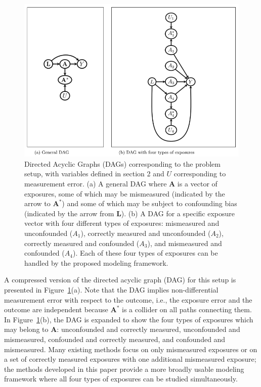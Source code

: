 \documentclass[useAMS,usenatbib,referee]{biom}
\begin{document}
\begin{figure}
\centering
\includegraphics[width=6in]{Paper1_Fig1.png}
\caption{Directed Acyclic Graphs (DAGs) corresponding to the problem setup, with variables defined in section 2 and $U$ corresponding to measurement error. (a) A general DAG where $\bm{A}$ is a vector of exposures, some of which may be mismeasured (indicated by the arrow to $\bm{A}^{*}$) and some of which may be subject to confounding bias (indicated by the arrow from $\bm{L}$). (b) A DAG for a specific exposure vector with four different types of exposures: mismeasured and unconfounded ($A_{1}$), correctly measured and unconfounded ($A_{2}$), correctly measured and confounded ($A_{3}$), and mismeasured and confounded ($A_{4}$). Each of these four types of exposures can be handled by the proposed modeling framework.}
\label{fig:one}
\end{figure}

A compressed version of the directed acyclic graph (DAG) for this setup is presented in Figure~\ref{fig:one}(a). Note that the DAG implies non-differential measurement error with respect to the outcome, i.e., the exposure error and the outcome are independent because $\bm{A}^{*}$ is a collider on all paths connecting them. In Figure~\ref{fig:one}(b), the DAG is expanded to show the four types of exposures which may belong to $\bm{A}$: unconfounded and correctly measured, unconfounded and mismeasured, confounded and correctly measured, and confounded and mismeasured. Many existing methods focus on only mismeasured exposures or on a set of correctly measured exposures with one additional mismeasured exposure; the methods developed in this paper provide a more broadly usable modeling framework where all four types of exposures can be studied simultaneously.
\end{document}
